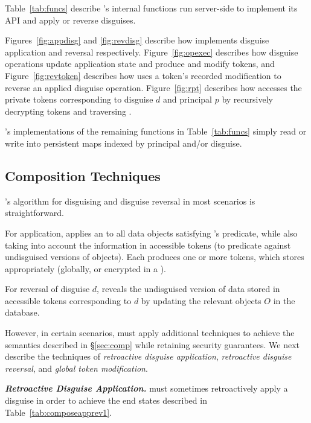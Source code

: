 Table~\ref{tab:funcs} describe \sys's internal functions run server-side to implement its API 
and apply or reverse disguises. 

Figures~\ref{fig:appdisg} and \ref{fig:revdisg} describe how \sys implements disguise application and
reversal respectively. Figure~\ref{fig:opexec} describes how disguise operations update application
state and produce and modify tokens, and 
Figure~\ref{fig:revtoken} describes how \sys uses a token's recorded
modification to reverse an applied disguise operation. 
Figure~\ref{fig:rpt} describes how \sys accesses the private tokens
corresponding to disguise $d$ and principal $p$ by recursively decrypting tokens and traversing
.

\sys's implementations of the remaining functions in Table~\ref{tab:funcs} simply read or write into
persistent maps indexed by principal and/or disguise.

\subsection{Composition Techniques}
\sys's algorithm for disguising and disguise reversal in most scenarios is straightforward. 

For application, \sys applies an  to all
data objects satisfying 's predicate, while also taking into account the information in
accessible tokens (to \eg predicate against undisguised versions of objects). Each  produces
one or more tokens, which \sys stores appropriately (globally, or encrypted in a ).

For reversal of disguise $d$, \sys reveals the undisguised version of data stored in accessible tokens
corresponding to $d$ by updating the relevant objects $O$ in the database.

However, in certain scenarios, \sys must apply additional techniques to achieve the semantics
described in \S\ref{sec:comp} while retaining security guarantees. We next describe the techniques
of \emph{retroactive disguise application}, \emph{retroactive disguise reversal}, and \emph{global
token modification}.

\vspace{6pt}\noindent\textbf{\emph{Retroactive Disguise Application.}}
\sys must sometimes retroactively apply a disguise in order to achieve the end states
described in Table~\ref{tab:composeapprev1}. 

